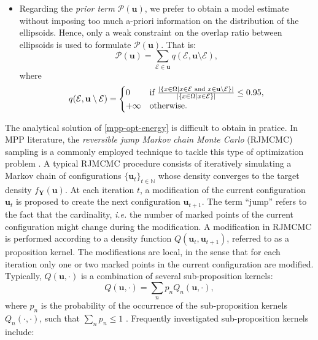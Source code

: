 \documentclass[journal]{IEEEtran}
\begin{document}
\begin{itemize}
\item Regarding the \textit{prior term} $\mathcal{P} (\mathbf{u})$, we
  prefer to obtain a model estimate without imposing too much a-priori
  information on the distribution of the ellipsoids. Hence, only a
  weak constraint on the overlap ratio between ellipsoids is used to
  formulate $\mathcal{P} (\mathbf{u})$. That is:
  \begin{equation}
    \label{eq:prior-term}
    \mathcal{P} (\mathbf{u}) = \sum_{\mathcal{E} \in \mathbf{u}}
    q(\mathcal{E}, \mathbf{u} \setminus \mathcal{E}),
  \end{equation}
  where
  \begin{equation}
    \label{eq:prior-term-detail}
    q(\mathcal{E}, \mathbf{u} \setminus \mathcal{E}) =
    \begin{cases}
      0 & \textnormal{if }\frac{ | \{ x \in \Omega | x \in \mathcal{E}
        \textnormal{ and } x \in \mathbf{u} \setminus \mathcal{E} \}
        |} { | \{ x \in \Omega | x \in \mathcal{E} \} |}
      \le 0.95, \\
      +\infty & \textnormal{otherwise}.
    \end{cases}
  \end{equation}

\end{itemize}

The analytical solution of \eqref{mpp-opt-energy} is difficult to
obtain in pratice. In MPP literature, the \textit{reversible jump
  Markov chain Monte Carlo} (RJMCMC) sampling is a commonly employed
technique to tackle this type of optimization problem
\cite{descombes2013stochastic}. A typical RJMCMC procedure consists of
iteratively simulating a Markov chain of configurations
$\{ \mathbf{u}_t \}_{t \in \mathbb{N}}$ whose density converges to the
target density $f_{\mathbf{Y}}(\mathbf{u})$. At each iteration $t$, a
modification of the current configuration $\mathbf{u}_t$ is proposed
to create the next configuration $\mathbf{u}_{t+1}$. The term ``jump''
refers to the fact that the cardinality, \textit{i.e.} the number of
marked points of the current configuration might change during the
modification. A modification in RJMCMC is performed according to a
density function $Q(\mathbf{u}_t, \mathbf{u}_{t+1})$, referred to as a
proposition kernel. The modifications are local, in the sense that for
each iteration only one or two marked points in the current
configuration are modified. Typically, $Q(\mathbf{u}, \cdot)$ is a
combination of several sub-proposition kernels:
\begin{equation}
  \label{eq:sub-kernels}
  Q(\mathbf{u}, \cdot) = \sum_n p_n Q_n (\mathbf{u}, \cdot),
\end{equation}
where $p_n$ is the probability of the occurrence of the
sub-proposition kernels $Q_n(\cdot, \cdot)$, such that
$\sum_n p_n \le 1$ \cite{descombes2013stochastic}
\cite{verdie2014detecting}. Frequently investigated sub-proposition
kernels include:
\end{document}
